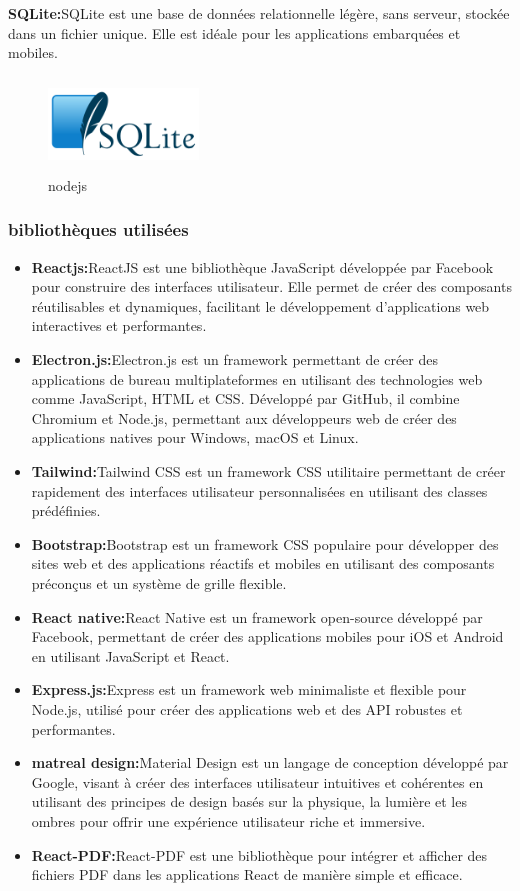 \documentclass[edit,12pt,a4paper,ChapStyle,oneside,doubleinterligne]{report}
\begin{document}
\textbf{SQLite:}SQLite est une base de données relationnelle légère, sans serveur, stockée dans un fichier unique. Elle est idéale pour les applications embarquées et mobiles.\cite{sqlite}
    \begin{figure}[H]\label{fig:nodejs}
        \centering
        \includegraphics[width=4cm , height = 2.5cm , angle=360]{images/SQLite370.png}
        \caption{nodejs}
        \end{figure}
\subsubsection{bibliothèques utilisées}
\begin{itemize}
    \item \textbf{Reactjs:}ReactJS est une bibliothèque JavaScript développée par Facebook pour construire des interfaces utilisateur. Elle permet de créer des composants réutilisables et dynamiques, facilitant le développement d'applications web interactives et performantes.\cite{reactjs}
    \item \textbf{Electron.js:}Electron.js est un framework permettant de créer des applications de bureau multiplateformes en utilisant des technologies web comme JavaScript, HTML et CSS. Développé par GitHub, il combine Chromium et Node.js, permettant aux développeurs web de créer des applications natives pour Windows, macOS et Linux.\cite{electron}
    \item \textbf{Tailwind:}Tailwind CSS est un framework CSS utilitaire permettant de créer rapidement des interfaces utilisateur personnalisées en utilisant des classes prédéfinies.\cite{tailwind}
    \item \textbf{Bootstrap:}Bootstrap est un framework CSS populaire pour développer des sites web et des applications réactifs et mobiles en utilisant des composants préconçus et un système de grille flexible.\cite{Bootstrap}
    \item \textbf{React native:}React Native est un framework open-source développé par Facebook, permettant de créer des applications mobiles pour iOS et Android en utilisant JavaScript et React.\cite{reactn}
    \item \textbf{Express.js:}Express est un framework web minimaliste et flexible pour Node.js, utilisé pour créer des applications web et des API robustes et performantes.\cite{express}
    \item \textbf{matreal design:}Material Design est un langage de conception développé par Google, visant à créer des interfaces utilisateur intuitives et cohérentes en utilisant des principes de design basés sur la physique, la lumière et les ombres pour offrir une expérience utilisateur riche et immersive.\cite{matreal}
    \item \textbf{React-PDF:}React-PDF est une bibliothèque pour intégrer et afficher des fichiers PDF dans les applications React de manière simple et efficace.
\end{itemize}
\end{document}
